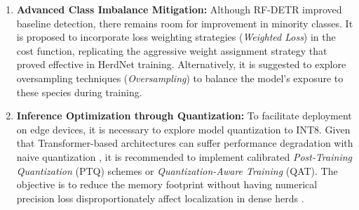 \begin{enumerate}
    \item \textbf{Advanced Class Imbalance Mitigation:}
    Although RF-DETR improved baseline detection, there remains room for improvement in minority classes. It is proposed to incorporate loss weighting strategies (\textit{Weighted Loss}) in the cost function, replicating the aggressive weight assignment strategy that proved effective in HerdNet training. Alternatively, it is suggested to explore oversampling techniques (\textit{Oversampling}) to balance the model's exposure to these species during training.

    \item \textbf{Inference Optimization through Quantization:}
    To facilitate deployment on edge devices, it is necessary to explore model quantization to INT8. Given that Transformer-based architectures can suffer performance degradation with naive quantization \cite{rf-detr}, it is recommended to implement calibrated \textit{Post-Training Quantization} (PTQ) schemes \cite{fima-q} or \textit{Quantization-Aware Training} (QAT). The objective is to reduce the memory footprint without having numerical precision loss disproportionately affect localization in dense herds \cite{hqod}.


\end{enumerate}
